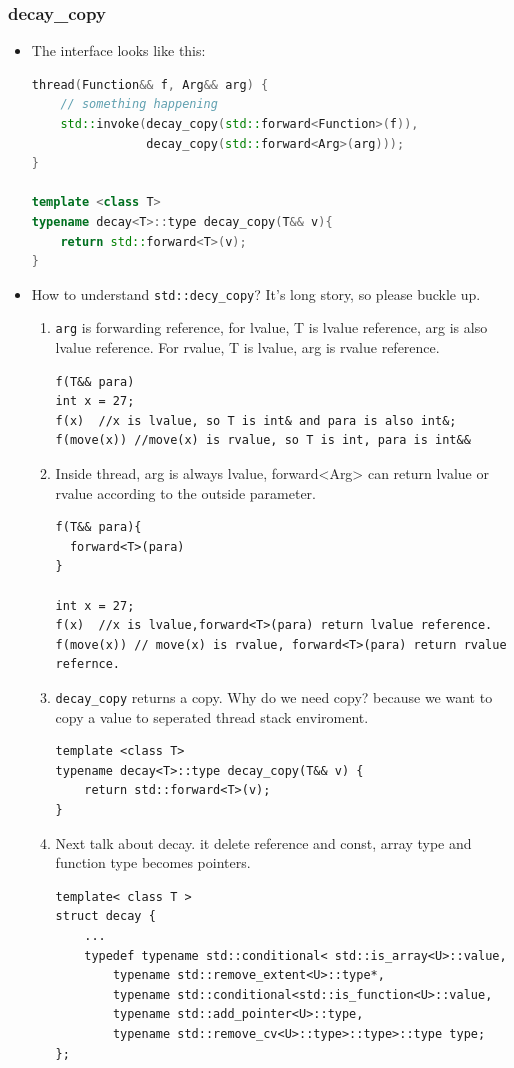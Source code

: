 \documentclass[a4paper,11pt,twoside]{book}
\begin{document}
\subsubsection{decay\_copy}
\begin{itemize}

    \item The interface looks like this:
\begin{lstlisting}[frame=single, language=c++]
thread(Function&& f, Arg&& arg) {
	// something happening
	std::invoke(decay_copy(std::forward<Function>(f)),
            	decay_copy(std::forward<Arg>(arg)));
}
	
template <class T> 
typename decay<T>::type decay_copy(T&& v){
	return std::forward<T>(v); 
}
\end{lstlisting}

		\item How to understand \texttt{std::decy\_copy}? It's long story, so please buckle up.

		\begin{enumerate}
			\item \texttt{arg} is forwarding reference, for lvalue, T is lvalue reference, arg is also lvalue reference. For rvalue, T is lvalue, arg is rvalue reference. 
\begin{lstlisting}
f(T&& para)
int x = 27;
f(x)  //x is lvalue, so T is int& and para is also int&;
f(move(x)) //move(x) is rvalue, so T is int, para is int&&
\end{lstlisting}

		\item Inside thread, arg is always lvalue, forward<Arg> can return lvalue or rvalue according to the outside parameter. 
\begin{lstlisting}
f(T&& para){
  forward<T>(para)
}

int x = 27;
f(x)  //x is lvalue,forward<T>(para) return lvalue reference. 
f(move(x)) // move(x) is rvalue, forward<T>(para) return rvalue refernce. 
\end{lstlisting}

		\item \texttt{decay\_copy} returns a copy. Why do we need copy? because we want to copy a value to seperated thread stack enviroment. 
\begin{lstlisting}
template <class T>
typename decay<T>::type decay_copy(T&& v) {
    return std::forward<T>(v);
}
\end{lstlisting}

		\item Next talk about decay. it delete reference and const, array type and function type becomes pointers.
\begin{lstlisting}
template< class T >
struct decay {
	...
    typedef typename std::conditional< std::is_array<U>::value,
        typename std::remove_extent<U>::type*,
        typename std::conditional<std::is_function<U>::value,
        typename std::add_pointer<U>::type,
        typename std::remove_cv<U>::type>::type>::type type;
};
\end{lstlisting}
	

\end{enumerate}
\end{itemize}
\end{document}
